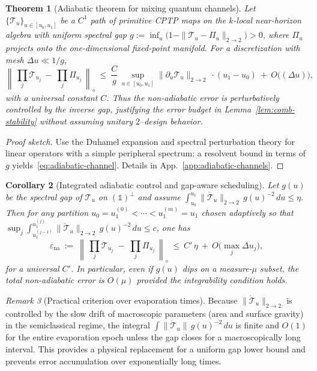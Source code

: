 \documentclass[aps,prd,preprint,onecolumn,superscriptaddress,nofootinbib,longbibliography,floatfix,11pt,showpacs,showkeys]{revtex4-2}
\theoremstyle{plain}
\newtheorem{theorem}{Theorem}
\newtheorem{corollary}[theorem]{Corollary}
\theoremstyle{definition}
\theoremstyle{remark}
\newtheorem{remark}[theorem]{Remark}
\begin{document}
\begin{theorem}[Adiabatic theorem for mixing quantum channels]\label{thm:adiabatic-channel}
Let $\{\mathcal{T}_u\}_{u\in[u_0,u_1]}$ be a $C^1$ path of primitive CPTP maps on the $k$-local near-horizon algebra with uniform spectral gap $g:=\inf_u\big(1-\|\mathcal{T}_u-\Pi_u\|_{2\to 2}\big)>0$, where $\Pi_u$ projects onto the one-dimensional fixed-point manifold. For a discretization with mesh $\Delta u\ll 1/g$,
\begin{equation}\label{eq:adiabatic-channel}
\left\|\,\prod_{j}\mathcal{T}_{u_j}\ -\ \prod_{j}\Pi_{u_j}\,\right\|_\diamond\ \le\ \frac{C}{g}\,\sup_{u\in[u_0,u_1]}\|\partial_u \mathcal{T}_u\|_{2\to 2}\ \cdot (u_1-u_0)\ +\ O\!\big((\Delta u)\big),
\end{equation}
with a universal constant $C$. Thus the non-adiabatic error is perturbatively controlled by the inverse gap, justifying the error budget in Lemma~\ref{lem:comb-stability} without assuming unitary $2$--design behavior.
\end{theorem}
\begin{proof}[Proof sketch]
Use the Duhamel expansion and spectral perturbation theory for linear operators with a simple peripheral spectrum; a resolvent bound in terms of $g$ yields~\eqref{eq:adiabatic-channel}. Details in App.~\ref{app:adiabatic-channels}.
\end{proof}


\begin{corollary}[Integrated adiabatic control and gap-aware scheduling]\label{cor:adiabatic-integrated}
Let $g(u)$ be the spectral gap of $\mathcal{T}_u$ on $(\mathbb{1})^\perp$ and assume $\int_{u_0}^{u_1}\|\dot{\mathcal{T}}_u\|_{2\to 2}\,g(u)^{-2}\,du\le \eta$.
Then for any partition $u_0=u_1^{(0)}<\cdots<u_1^{(m)}=u_1$ chosen adaptively so that $\sup_j \int_{u_1^{(j-1)}}^{u_1^{(j)}}\|\dot{\mathcal{T}}_u\|_{2\to 2}\,g(u)^{-2}\,du\le c$,
one has
\[
\varepsilon_{\mathrm{na}} \ :=\ \left\|\,\prod_{j}\mathcal{T}_{u_j}\;-\;\prod_{j}\Pi_{u_j}\,\right\|_{\diamond}\ \le\ C'\,\eta\ +\ O\!\big(\max_j \Delta u_j\big),
\]
for a universal $C'$. In particular, even if $g(u)$ dips on a measure-$\mu$ subset, the total non-adiabatic error is $O(\mu)$ provided the integrability condition holds.
\end{corollary}

\begin{remark}[Practical criterion over evaporation times]\label{rem:integrated-criterion}
Because $\|\dot{\mathcal{T}}_u\|_{2\to 2}$ is controlled by the slow drift of macroscopic parameters (area and surface gravity) in the semiclassical regime,
the integral $\int \|\dot{\mathcal{T}}_u\|\,g(u)^{-2}\,du$ is finite and $O(1)$ for the entire evaporation epoch unless the gap closes for a macroscopically long interval.
This provides a physical replacement for a uniform gap lower bound and prevents error accumulation over exponentially long times.
\end{remark}
\end{document}
